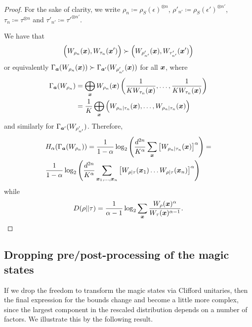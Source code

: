 \documentclass[pra,
aps,
twocolumn,
superscriptaddress,
groupedaddress,
nofootinbib,
reprint
]{revtex4-1}
\begin{document}
\begin{proof}
	For the sake of clarity, we write $\rho_n \coloneqq \rho_S(\epsilon)^{\otimes n}$, $\rho'_{n'} \coloneqq \rho_S(\epsilon')^{\otimes n'}$, $\tau_n \coloneqq \tau^{\otimes n}$ and $\tau'_{n'} \coloneqq \tau'^{\otimes n'}$.
	
	We have that 
\begin{equation}	
	\Big(W_{\rho_n}(\bm{x}), W_{\tau_n}(\bm{x}')\Big) \succ \Big(W_{\rho'_{n'}}(\bm{x}), W_{\tau'_{n'}}(\bm{x}')\Big)
\end{equation}	
or equivalently $\Gamma_{\bm{a}}(W_{\rho_n}(\bm{x})) \succ \Gamma_{\bm{a}'}(W_{\rho'_{n'}}(\bm{x}))$ for all $\bm{x}$, where
\begin{align}
	\Gamma_{\bm{a}}(W_{\rho_n}) &= \bigoplus_{\bm{x}} W_{\rho_n}(\bm{x}) \left(\frac{1}{KW_{\tau_n}(\bm{x})}, \dots, \frac{1}{KW_{\tau_n}(\bm{x})} \right)\nonumber\\
	&= \frac{1}{K}\bigoplus_{\bm{x}} \Big( W_{\rho_n|\tau_n}(\bm{x}), \dots, W_{\rho_n|\tau_n}(\bm{x}) \Big)
\end{align}
and similarly for $\Gamma_{\bm{a}'}(W_{\rho'_{n'}})$.
Therefore,
\begin{align}
	&H_{\alpha}(\Gamma_{\bm{a}}(W_{\rho_n})) = \frac{1}{1-\alpha} \log_2 \left( \frac{d^{2n}}{K^\alpha} \sum_{\bm{x}} \big[ W_{\rho_n|\tau_n}(\bm{x}) \big]^\alpha \right) = \nonumber\\
	&\frac{1}{1-\alpha} \log_2 \left( \frac{d^{2n}}{K^\alpha} \sum_{\bm{x}_1, \dots, \bm{x}_n} \big[ W_{\rho|\tau}(\bm{x}_1) \dots W_{\rho|\tau}(\bm{x}_n) \big]^\alpha \right)
\end{align}
while
\begin{equation}
	D(\rho||\tau) = \frac{1}{\alpha-1} \log_2 \sum_{\bm{x}} \frac{W_{\rho}(\bm{x})^\alpha}{W_{\tau}(\bm{x})^{\alpha-1}}.
\end{equation}
\end{proof}


\subsection{Dropping pre/post-processing of the magic states}
\label{app:cliff_processing}

If we drop the freedom to transform the magic states via Clifford unitaries, then the final expression for the bounds change and become a little more complex, since the largest component in the rescaled distribution depends on a number of factors. We illustrate this by the following result.
\end{document}
